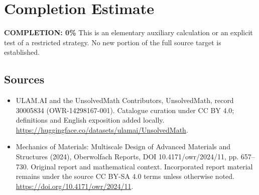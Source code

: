 \documentclass[11pt]{article}
\begin{document}
\section{Completion Estimate}
\noindent\textbf{COMPLETION: 0\%}
This is an elementary auxiliary calculation or an explicit test of a restricted strategy. No new portion of the full source target is established.

\subsection{Sources}
\begin{itemize}
\item[\hypertarget{source:30005834:1}{S1}] ULAM.AI and the UnsolvedMath Contributors, UnsolvedMath, record 30005834 (OWR-14298167-001). Catalogue curation under CC BY 4.0; definitions and English exposition added locally.
\url{https://huggingface.co/datasets/ulamai/UnsolvedMath}.
\item[\hypertarget{source:30005834:2}{S2}] Mechanics of Materials: Multiscale Design of Advanced Materials and Structures (2024), Oberwolfach Reports, DOI 10.4171/owr/2024/11, pp. 657--730. Original report and mathematical context. Incorporated report material remains under the source CC BY-SA 4.0 terms unless otherwise noted.
\url{https://doi.org/10.4171/owr/2024/11}.
\end{itemize}
\label{end:30005834}
\end{document}
